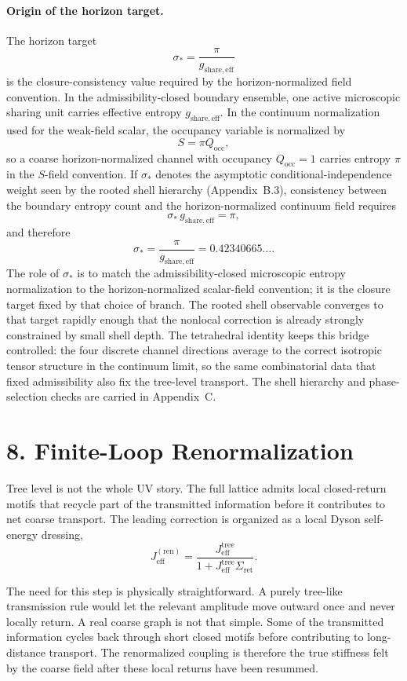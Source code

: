 \documentclass[11pt]{article}
\begin{document}
\paragraph{Origin of the horizon target.}
The horizon target
\[
\sigma_*=\frac{\pi}{g_{\mathrm{share,eff}}}
\]
is the closure-consistency value required by the horizon-normalized field convention. In the admissibility-closed boundary ensemble, one active microscopic sharing unit carries effective entropy $g_{\mathrm{share,eff}}$. In the continuum normalization used for the weak-field scalar, the occupancy variable is normalized by
\[
S=\pi Q_{\mathrm{occ}},
\]
so a coarse horizon-normalized channel with occupancy $Q_{\mathrm{occ}}=1$ carries entropy $\pi$ in the $S$-field convention. If $\sigma_*$ denotes the asymptotic conditional-independence weight seen by the rooted shell hierarchy (Appendix~B.3), consistency between the boundary entropy count and the horizon-normalized continuum field requires
\[
\sigma_*\,g_{\mathrm{share,eff}}=\pi,
\]
and therefore
\[
\sigma_*=\frac{\pi}{g_{\mathrm{share,eff}}}=0.42340665\ldots .
\]
The role of $\sigma_*$ is to match the admissibility-closed microscopic entropy normalization to the horizon-normalized scalar-field convention; it is the closure target fixed by that choice of branch. The rooted shell observable converges to that target rapidly enough that the nonlocal correction is already strongly constrained by small shell depth. The tetrahedral identity keeps this bridge controlled: the four discrete channel directions average to the correct isotropic tensor structure in the continuum limit, so the same combinatorial data that fixed admissibility also fix the tree-level transport. The shell hierarchy and phase-selection checks are carried in Appendix~C.

\section{8. Finite-Loop Renormalization}

Tree level is not the whole UV story. The full lattice admits local closed-return motifs that recycle part of the transmitted information before it contributes to net coarse transport. The leading correction is organized as a local Dyson self-energy dressing,
\[
J_{\mathrm{eff}}^{(\mathrm{ren})}
=
\frac{J_{\mathrm{eff}}^{\mathrm{tree}}}{1+J_{\mathrm{eff}}^{\mathrm{tree}}\Sigma_{\mathrm{ret}}}.
\]

The need for this step is physically straightforward. A purely tree-like transmission rule would let the relevant amplitude move outward once and never locally return. A real coarse graph is not that simple. Some of the transmitted information cycles back through short closed motifs before contributing to long-distance transport. The renormalized coupling is therefore the true stiffness felt by the coarse field after these local returns have been resummed.
\end{document}
